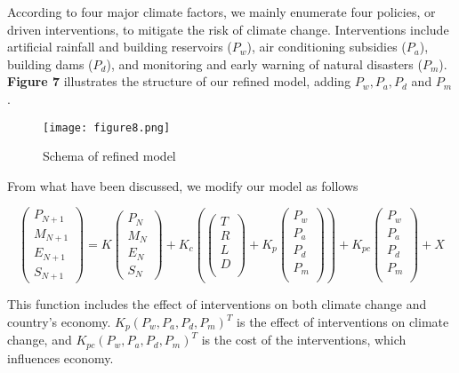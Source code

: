 \documentclass{mcmthesis}
\begin{document}
	According to four major climate factors, we mainly enumerate four policies, or driven interventions, to mitigate the risk of climate change. Interventions include artificial rainfall and building reservoirs ($P_w$), air conditioning subsidies ($P_a$), building dams ($P_d$), and monitoring and early warning of natural disasters ($P_m$). \textbf{Figure 7} illustrates the structure of our  refined model, adding $P_w,P_a,P_d$ and $P_m$.
	
	\begin{figure}[h]
		\small
		\centering
		\texttt{[image: figure8.png]}
		\caption{Schema of refined model} \label{fig:Schema of refined model}
	\end{figure}
	
	From what have been discussed, we modify our model as follows
	  	\begin{spacing}{1.5}
	  	$$
	  	\left(
	  	\begin{matrix}
	  	P_{N+1} \\ M_{N+1} \\ E_{N+1} \\ S_{N+1}
	  	\end{matrix}
	  	\right) 
	  	= 
	  	K 
	  	\left(
	  	\begin{matrix}
	  	P_N \\ M_N \\ E_N \\ S_N
	  	\end{matrix}
	  	\right) 
	  	+
	  	K_c
	  	\left(
	  	\left(
	  	\begin{matrix}
	  	T \\ R \\ L \\ D \\
	  	\end{matrix}
	  	\right)
	  	+ 
	  	K_p
	  	\left(
	  	\begin{matrix}
	  	P_w \\ P_a \\ P_d \\ P_m \\
	  	\end{matrix}
	  	\right)
	  	\right)
	  	+
	  	K_{pc}
	  	\left(
	  	\begin{matrix}
	  	P_w \\ P_a \\ P_d \\ P_m \\
	  	\end{matrix}
	  	\right)
	  	+ X
	  	$$
	  \end{spacing}
	This function includes the effect of interventions on both climate change and country's economy. $K_p (P_w, P_a, P_d, P_m)^T$ is the effect of interventions on climate change, and $K_{pc} (P_w, P_a, P_d, P_m)^T$ is the cost of the interventions, which influences economy.
	
\end{document}
